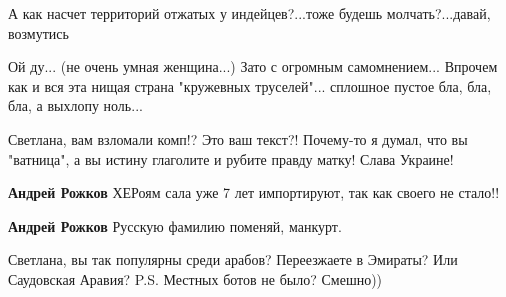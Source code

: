 \begin{itemize}
А как насчет территорий отжатых у индейцев?...тоже будешь молчать?...давай, возмутись

 
Ой ду... (не очень умная женщина...) Зато с огромным самомнением... Впрочем как и вся эта нищая страна "кружевных труселей"... сплошное пустое бла, бла, бла, а выхлопу ноль...

 
Светлана, вам взломали комп!? Это ваш текст?! Почему-то я думал, что вы
"ватница", а вы истину глаголите и рубите правду матку! Слава Украине!

\begin{itemize}
 
\textbf{Андрей Рожков} ХЕРоям сала уже 7 лет импортируют, так как своего не стало!!

 
\textbf{Андрей Рожков} Русскую фамилию поменяй, манкурт.
\end{itemize}

 
Светлана, вы так популярны среди арабов? Переезжаете в Эмираты? Или Саудовская Аравия?
P.S. Местных ботов не было? Смешно))

 

\end{itemize}
